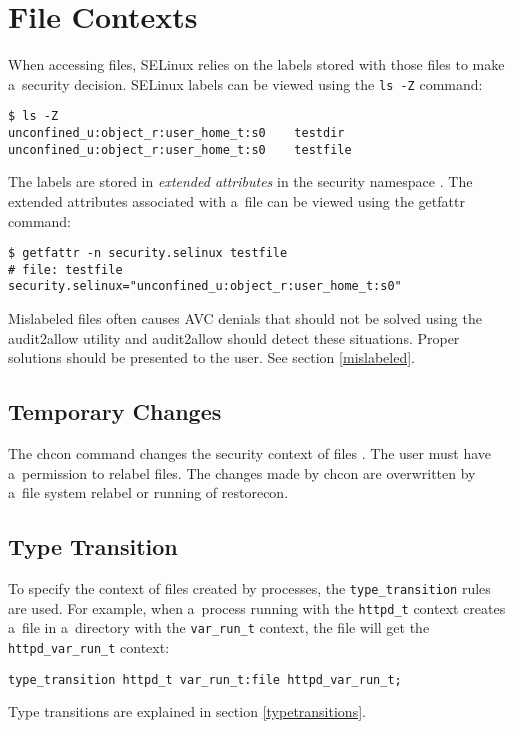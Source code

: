 \section{File Contexts}
\label{filecontexts}
When accessing files, SELinux relies on the labels stored with those files to
make a~security decision. SELinux labels can be viewed using the \texttt{ls -Z}
command:
\begin{lstlisting}
$ ls -Z
unconfined_u:object_r:user_home_t:s0    testdir
unconfined_u:object_r:user_home_t:s0    testfile
\end{lstlisting}
The labels are stored in \emph{extended attributes} in the security namespace
\cite{xattrman}. The extended attributes associated with a~file can be viewed
using the getfattr command:
\begin{lstlisting}
$ getfattr -n security.selinux testfile
# file: testfile
security.selinux="unconfined_u:object_r:user_home_t:s0"
\end{lstlisting}
Mislabeled files often causes AVC denials that should not be solved using the
audit2allow utility and audit2allow should detect these situations. Proper
solutions should be presented to the user. See section \ref{mislabeled}.

\subsection{Temporary Changes}
The chcon command changes the security context of files \cite{selinuxguide}. The
user must have a~permission to relabel files. The changes made by chcon are
overwritten by a~file system relabel or running of restorecon.

\subsection{Type Transition}
To specify the context of files created by processes, the
\texttt{type\_transition} rules are used. For example, when a~process running
with the \texttt{httpd\_t} context creates a~file in a~directory with the
\texttt{var\_run\_t} context, the file will get the
\texttt{httpd\_var\_run\_t} context:
\begin{lstlisting}[language=te]
type_transition httpd_t var_run_t:file httpd_var_run_t;
\end{lstlisting}
Type transitions are explained in section \ref{typetransitions}.

